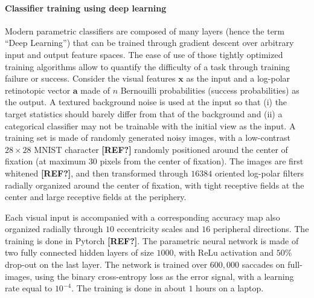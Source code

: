 \paragraph{Classifier training using deep learning}
Modern parametric classifiers are composed of many layers (hence the term ``Deep Learning'') that can be trained through gradient descent over arbitrary input and output feature spaces. The ease of use of those tightly optimized training algorithms allow to quantify the difficulty of a task through training failure or success. Consider the visual features $\boldsymbol{x}$ as the input and a log-polar retinotopic vector $\boldsymbol{a}$ made of $n$ Bernouilli probabilities (success probabilities) as the output. A textured background noise is used at the input so that (i) the target statistics should barely differ from that of the background and (ii) a categorical classifier may not be trainable with the initial view as the input. A training set is made of randomly generated noisy images, with a low-contrast $28\times 28$ MNIST character  {\bf [REF?]} randomly positioned around the center of fixation (at maximum $30$ pixels from the center of fixation). The images are first whitened {\bf [REF?]}, and then transformed through $16384$ oriented log-polar filters radially organized around the center of fixation, with tight receptive fields at the center and large receptive fields at the periphery. 

Each visual input is accompanied with a corresponding accuracy map also organized radially through $10$ eccentricity scales and $16$ peripheral directions. The training is done in Pytorch {\bf [REF?]}. The parametric neural network is made of two fully connected hidden layers of size $1000$, with ReLu activation and $50 \%$ drop-out on the last layer. The network is trained over $600,000$ saccades on full-images, using the binary cross-entropy loss as the error signal, with a learning rate equal to $10^{-4}$. The training is done in about $1$ hours on a laptop.



